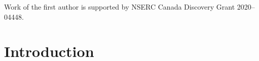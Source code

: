 %
%

\begin{GDacknowledgements}
Work of the first author is supported by NSERC Canada Discovery Grant 2020--04448.

\end{GDacknowledgements}


\GDarticlestart
\newpage
\section{Introduction}
\label{sec:intro}

